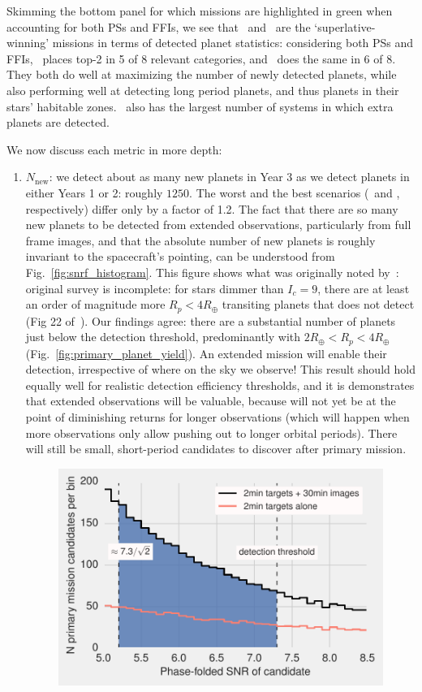 Skimming the bottom panel for which missions are highlighted in green when accounting for both PSs and FFIs, we see that \npole\ and \hemis\ are the `superlative-winning' missions in terms of detected planet statistics: considering both PSs and FFIs, \npole\ places top-2 in 5 of 8 relevant categories, and \hemis\ does the same in 6 of 8.
They both do well at maximizing the number of newly detected planets, while also performing well at detecting long period planets, and thus planets in their stars' habitable zones.
\hemis\ also has the largest number of systems in which extra planets are detected.

We now discuss each metric in more depth:
\begin{enumerate}
	\item $N_\mathrm{new}$: we detect about as many new planets in Year 3 as we detect planets in either Years 1 or 2: roughly $1250$.
	The worst and the best scenarios (\elong\ and \hemis, respectively) differ only by a factor of 1.2.
	The fact that there are so many new planets to be detected from extended observations, particularly from full frame images, and that the absolute number of new planets is roughly invariant to the spacecraft's pointing, can be understood from Fig.~\ref{fig:snrf_histogram}.
	This figure shows what was originally noted by~: \tesss original survey is incomplete: for stars dimmer than $I_c=9$, there are at least an order of magnitude more $R_p<4R_\oplus$ transiting planets that \tess does not detect (Fig 22 of~).
	Our findings agree: there are a substantial number of planets just below the detection threshold, predominantly with $2R_\oplus < R_p <4R_\oplus$ (Fig.~\ref{fig:primary_planet_yield}).
	An extended mission will enable their detection, irrespective of where on the sky we observe!
	This result should hold equally well for realistic detection efficiency thresholds, and it is demonstrates that extended observations will be valuable, because \tess will not yet be at the point of diminishing returns for longer observations (which will happen when more observations only allow pushing out to longer orbital periods). 
	There will still be small, short-period candidates to discover after \tesss primary mission.
\begin{figure}[!t]
	\centering
	\includegraphics[scale=1.]{figures/snrf_histogram_with_ps.pdf}

\end{figure}
\end{enumerate}
